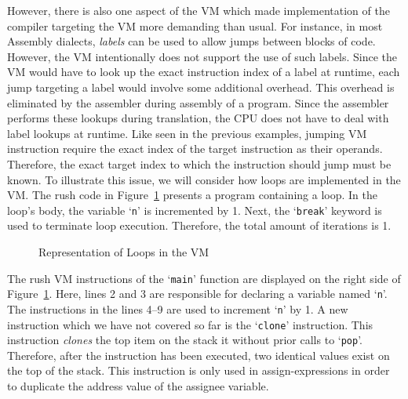 However, there is also one aspect of the VM which made implementation of the compiler targeting the VM more demanding than usual.
For instance, in most Assembly dialects, \emph{labels} can be used to allow jumps between blocks of code.
However, the VM intentionally does not support the use of such labels.
Since the VM would have to look up the exact instruction index of a label at runtime,
each jump targeting a label would involve some additional overhead.
This overhead is eliminated by the assembler during assembly of a program.
Since the assembler performs these lookups during translation,
the CPU does not have to deal with label lookups at runtime.
Like seen in the previous examples, jumping VM instruction require the exact index of the target instruction as their operands.
Therefore, the exact target index to which the instruction should jump must be known.
To illustrate this issue, we will consider how loops are implemented in the VM\@.
The rush code in Figure~\ref{fig:vm_loops} presents a program containing a loop.
In the loop's body, the variable `\texttt{n}' is incremented by 1.
Next, the `\texttt{break}' keyword is used to terminate loop execution.
Therefore, the total amount of iterations is 1.

\noindent
\begin{figure}[h]
	\begin{minipage}{.5\textwidth}
		\centering
	\end{minipage}%
	\begin{minipage}{.5\textwidth}
		\centering
	\end{minipage}
	\caption{Representation of Loops in the VM}\label{fig:vm_loops}
\end{figure}

The rush VM instructions of the `\texttt{main}' function are displayed on the right side of Figure~\ref{fig:vm_loops}.
Here, lines 2 and 3 are responsible for declaring a variable named `\texttt{n}'.
The instructions in the lines 4--9 are used to increment `\texttt{n}' by 1.
A new instruction which we have not covered so far is the `\texttt{clone}' instruction.
This instruction \emph{clones} the top item on the stack it without prior calls to `\texttt{pop}'.
Therefore, after the instruction has been executed, two identical values exist on the top of the stack.
This instruction is only used in assign-expressions in order to duplicate the address value of the assignee variable.

